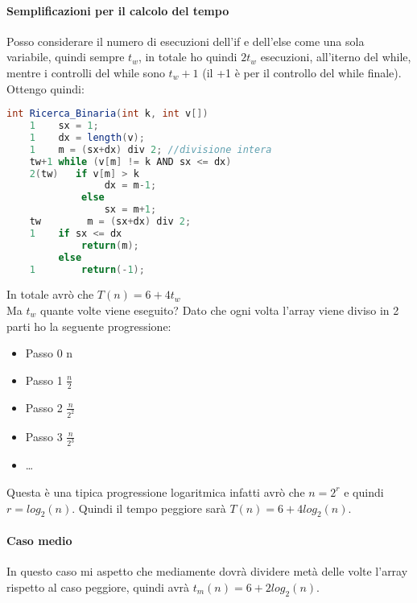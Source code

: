 \paragraph*{Semplificazioni per il calcolo del tempo}
Posso considerare il numero di esecuzioni dell'if e dell'else come una sola variabile, quindi sempre
$t_w$, in totale ho quindi $2t_w$ esecuzioni, all'iterno del while, mentre i controlli del
while sono $t_w +1$ (il +1 è per il controllo del while finale).\\
Ottengo quindi:
\begin{lstlisting}[language=Java]
    int Ricerca_Binaria(int k, int v[])
    1    sx = 1;
    1    dx = length(v);
    1    m = (sx+dx) div 2; //divisione intera
    tw+1 while (v[m] != k AND sx <= dx)
    2(tw)   if v[m] > k
                 dx = m-1;
             else 
                 sx = m+1;
    tw        m = (sx+dx) div 2;
    1    if sx <= dx
             return(m);
         else
    1        return(-1);
\end{lstlisting}
In totale avrò che $T(n) = 6 + 4t_w$\\
Ma $t_w$ quante volte viene eseguito? Dato che ogni volta l'array viene diviso in 2 parti 
ho la seguente progressione:
\begin{itemize}
    \item Passo 0 n
    \item Passo 1 $\frac{n}{2}$
    \item Passo 2 $\frac{n}{2^2}$
    \item Passo 3 $\frac{n}{2^3}$
    \item \dots
\end{itemize}
Questa è una tipica progressione logaritmica infatti avrò che $n = 2^r$ e quindi $r = log_2(n)$.
Quindi il tempo peggiore sarà $T(n) = 6 + 4log_2(n)$.
\paragraph*{Caso medio}
In questo caso mi aspetto che mediamente dovrà dividere metà delle volte l'array rispetto
al caso peggiore, quindi avrà $t_m(n) = 6 + 2log_2(n)$.
